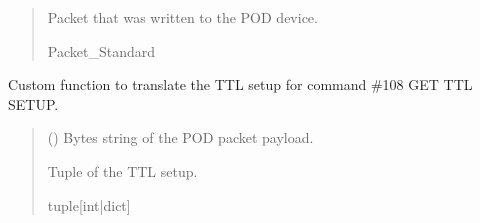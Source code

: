 \documentclass[letterpaper,10pt,english]{sphinxmanual}
\begin{document}
\begin{fulllineitems}
\begin{fulllineitems}
\begin{quote}
\begin{description}
\begin{itemize}
\end{itemize}

\sphinxAtStartPar
Packet that was written to the POD device.

\sphinxAtStartPar
Packet\_Standard

\end{description}\end{quote}

\end{fulllineitems}


\begin{fulllineitems}
\label{\detokenize{PodApi.Devices:PodApi.Devices.PodDevice_8480SC.Pod8480SC._Custom108GETTTLSETUP}}
\pysigstartsignatures
{}
\pysigstopsignatures
\sphinxAtStartPar
Custom function to translate the TTL setup for command \#108 GET TTL SETUP.
\begin{quote}\begin{description}
\sphinxAtStartPar
{} () \textendash{} Bytes string of the POD packet payload.

\sphinxAtStartPar
Tuple of the TTL setup.

\sphinxAtStartPar
tuple{[}int|dict{]}

\end{description}\end{quote}

\end{fulllineitems}



\end{fulllineitems}
\end{document}
